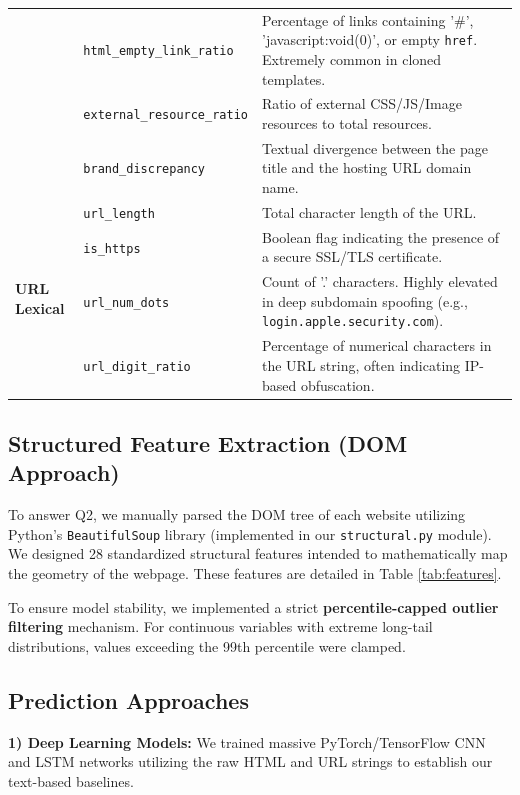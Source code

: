 \documentclass[conference]{IEEEtran}
\begin{document}
\begin{table}[t]
\begin{center}
\begin{tabular}{llp{10cm}}
& \texttt{html\_empty\_link\_ratio} & Percentage of links containing '\#', 'javascript:void(0)', or empty \texttt{href}. Extremely common in cloned templates. \\
& \texttt{external\_resource\_ratio} & Ratio of external CSS/JS/Image resources to total resources. \\
& \texttt{brand\_discrepancy} & Textual divergence between the page title and the hosting URL domain name. \\
\midrule
\multirow{4}{*}{\textbf{URL Lexical}} 
& \texttt{url\_length} & Total character length of the URL. \\
& \texttt{is\_https} & Boolean flag indicating the presence of a secure SSL/TLS certificate. \\
& \texttt{url\_num\_dots} & Count of '.' characters. Highly elevated in deep subdomain spoofing (e.g., \texttt{login.apple.security.com}). \\
& \texttt{url\_digit\_ratio} & Percentage of numerical characters in the URL string, often indicating IP-based obfuscation. \\
\bottomrule
\end{tabular}
\end{center}
\end{table}

\subsection{Structured Feature Extraction (DOM Approach)}
To answer Q2, we manually parsed the DOM tree of each website utilizing Python's \texttt{BeautifulSoup} library (implemented in our \texttt{structural.py} module). We designed 28 standardized structural features intended to mathematically map the geometry of the webpage. These features are detailed in Table \ref{tab:features}.

To ensure model stability, we implemented a strict \textbf{percentile-capped outlier filtering} mechanism. For continuous variables with extreme long-tail distributions, values exceeding the 99th percentile were clamped.

\subsection{Prediction Approaches}
\textbf{1) Deep Learning Models:} We trained massive PyTorch/TensorFlow CNN and LSTM networks utilizing the raw HTML and URL strings to establish our text-based baselines.
\end{document}
